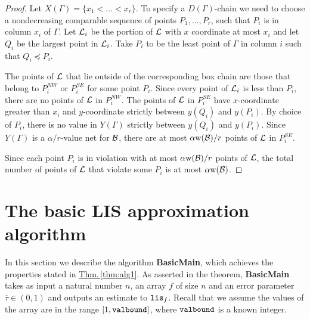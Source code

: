 \documentclass{acmsmall}
\newcommand{\cB}{{\cal B}}
\newcommand{\cL}{{\cal L}}
\newcommand{\Thm}[1]{\hyperref[thm:#1]{Thm.\,\ref*{thm:#1}}} %
\newcommand{\lis}{{\tt lis}}
\newcommand{\taupar}{\overline{\tau}}
\newcommand{\width}{{\bf {\rm  w}}}
\newcommand{\gridprec}{\alpha}
\newcommand{\basicmain}{{\rm {\bf BasicMain}}}
\newcommand{\maxval}{{\tt valbound}}
\begin{document}
\begin{proof}
Let $X(\Gamma)=\{x_1<\ldots<x_{r}\}$. 
To specify a $D(\Gamma)$-chain we need to choose a nondecreasing comparable sequence of points $P_1,\ldots,P_{r}$,
such that $P_i$ is in column $x_i$ of $\Gamma$. 
%
Let $\cL_i$ be the portion of $\cL$ with $x$ coordinate at most $x_i$ and let $Q_i$ be the largest
point in $\cL_i$.  Take $P_i$ to be the least point of $\Gamma$ in column $i$ such that $Q_i \preceq P_i$.

The points of $\cL$ that lie outside of the corresponding box chain are those that belong to $P_i^{NW}$ or $P_i^{SE}$
for some point $P_i$.  Since every point of $\cL_i$ is less than $P_i$, there are no points of $\cL$ in $P_i^{NW}$.
The points of $\cL$ in $P_i^{SE}$ have $x$-coordinate greater than $x_i$ and $y$-coordinate
strictly between $y(Q_i)$ and $y(P_i)$. By choice of $P_i$, there is no value in $Y(\Gamma)$
strictly between $y(Q_i)$ and $y(P_i)$. Since $Y(\Gamma)$ is a $\gridprec/r$-value net for $\cB$,
there are at most $\gridprec\width(\cB)/r$ points of $\cL$ in $P_i^{SE}$.
%

Since each point $P_i$ is in violation with at most $\gridprec\width(\cB)/r$ points of $\cL$, the total
number of points of $\cL$ that violate some $P_i$ is at most $\gridprec \width(\cB)$.
\end{proof}
%



\section{The basic LIS approximation algorithm}
\label{sec:first algorithm}




In this section  we describe the algorithm \basicmain, which achieves the properties
stated in \Thm{alg1}.    As asserted in the theorem, \basicmain{} takes as input a natural number $n$, an array $f$
of size $n$ and an error parameter $\taupar \in (0,1)$ and outputs an estimate to $\lis_f$.  Recall that we assume the
values of the array are in the range $[1,\maxval]$, where $\maxval$ is a known integer.
\end{document}
